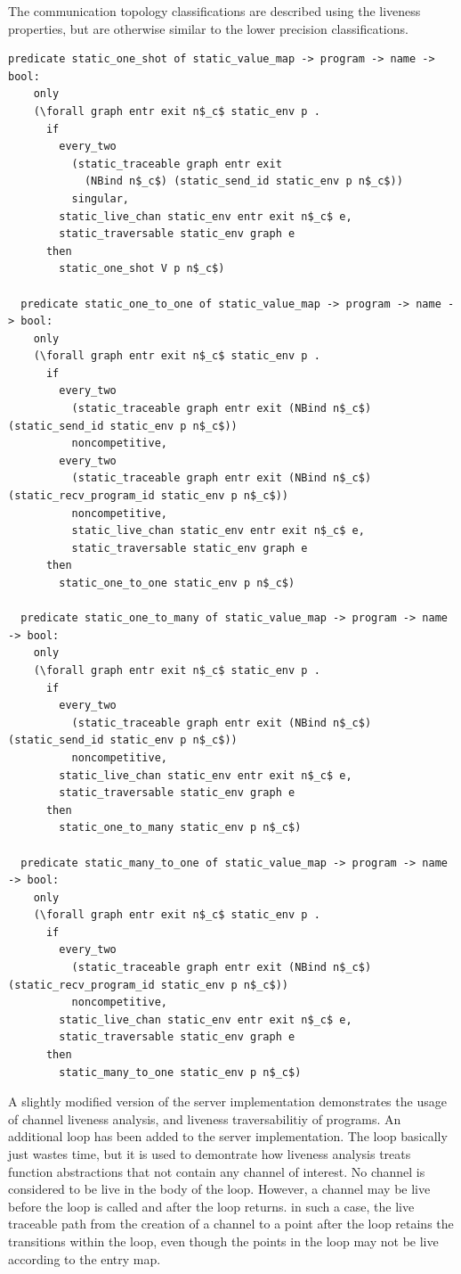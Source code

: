 \documentclass[10pt]{article}
\begin{document}
The communication topology classifications are described using the liveness properties, but
are otherwise similar to the lower precision classifications.

\begin{lstlisting}[language=logic, mathescape]
  predicate static_one_shot of static_value_map -> program -> name -> bool:
    only
    (\forall graph entr exit n$_c$ static_env p . 
      if
        every_two
          (static_traceable graph entr exit
            (NBind n$_c$) (static_send_id static_env p n$_c$))
          singular, 
        static_live_chan static_env entr exit n$_c$ e, 
        static_traversable static_env graph e
      then
        static_one_shot V p n$_c$)

  predicate static_one_to_one of static_value_map -> program -> name -> bool:
    only
    (\forall graph entr exit n$_c$ static_env p .
      if
        every_two
          (static_traceable graph entr exit (NBind n$_c$) (static_send_id static_env p n$_c$))
          noncompetitive, 
        every_two
          (static_traceable graph entr exit (NBind n$_c$) (static_recv_program_id static_env p n$_c$))
          noncompetitive,
          static_live_chan static_env entr exit n$_c$ e,
          static_traversable static_env graph e
      then
        static_one_to_one static_env p n$_c$)

  predicate static_one_to_many of static_value_map -> program -> name -> bool:
    only
    (\forall graph entr exit n$_c$ static_env p .
      if
        every_two
          (static_traceable graph entr exit (NBind n$_c$) (static_send_id static_env p n$_c$))
          noncompetitive,
        static_live_chan static_env entr exit n$_c$ e,
        static_traversable static_env graph e
      then
        static_one_to_many static_env p n$_c$)

  predicate static_many_to_one of static_value_map -> program -> name -> bool:
    only
    (\forall graph entr exit n$_c$ static_env p .
      if
        every_two
          (static_traceable graph entr exit (NBind n$_c$) (static_recv_program_id static_env p n$_c$))
          noncompetitive, 
        static_live_chan static_env entr exit n$_c$ e,
        static_traversable static_env graph e
      then
        static_many_to_one static_env p n$_c$)
  \end{lstlisting}


A slightly modified version of the server implementation demonstrates the usage of channel liveness
analysis, and liveness traversabilitiy of programs.  An additional loop has been added to the
server implementation.  The loop basically just wastes time, but it is used to demontrate how
liveness analysis treats function abstractions that not contain
any channel of interest.  No channel is
considered to be live in the body of the loop.  However, a channel may be live before the loop is
called and after the loop returns.  in such a case, the live traceable path from the creation of a
channel to a point after the loop retains the transitions within the loop, even though the points in
the loop may not be live according to the entry map.
\end{document}
